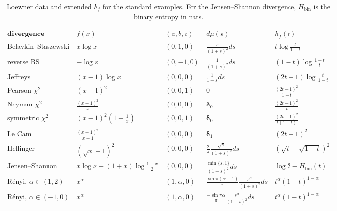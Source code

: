\begin{table}[htbp]
\centering\small
\begin{tabular}{@{}lllll@{}}
\hline
divergence & $f(x)$ & $(a,b,c)$ & $d\mu(s)$ & $h_f(t)$ \\
\hline
Belavkin--Staszewski & $x\log x$ & $(0,1,0)$ & $\frac{s}{(1+s)^2}ds$ & $t\log\frac{t}{1-t}$ \\[2pt]
reverse BS & $-\log x$ & $(0,-1,0)$ & $\frac{1}{(1+s)^2}ds$ & $(1-t)\log\frac{1-t}{t}$ \\[2pt]
Jeffreys & $(x-1)\log x$ & $(0,0,0)$ & $\frac{1}{1+s}ds$ & $(2t-1)\log\frac{t}{1-t}$ \\[2pt]
Pearson $\chi^2$ & $(x-1)^2$ & $(0,0,1)$ & $0$ & $\frac{(2t-1)^2}{1-t}$ \\[2pt]
Neyman $\chi^2$ & $\frac{(x-1)^2}{x}$ & $(0,0,0)$ & $\boldsymbol{\delta}_0$ & $\frac{(2t-1)^2}{t}$ \\[2pt]
symmetric $\chi^2$ & $(x-1)^2(1+\frac1x)$ & $(0,0,1)$ & $\boldsymbol{\delta}_0$ & $\frac{(2t-1)^2}{t(1-t)}$ \\[2pt]
Le Cam & $\frac{(x-1)^2}{x+1}$ & $(0,0,0)$ & $\boldsymbol{\delta}_1$ & $(2t-1)^2$ \\[2pt]
Hellinger & $(\sqrt x-1)^2$ & $(0,0,0)$ & $\frac2\pi\frac{\sqrt s}{(1+s)^2}ds$ & $(\sqrt t-\sqrt{1-t})^2$ \\[2pt]
Jensen--Shannon & $x\log x-(1+x)\log\frac{1+x}{2}$ & $(0,0,0)$ & $\frac{\min\{s,1\}}{(1+s)^2}ds$ & $\log2-H_{\mathrm{bin}}(t)$ \\[2pt]
R\'enyi, $\alpha\in(1,2)$ & $x^\alpha$ & $(1,\alpha,0)$ & $\frac{\sin\pi(\alpha-1)}{\pi}\frac{s^\alpha}{(1+s)^2}ds$ & $t^\alpha(1-t)^{1-\alpha}$ \\[2pt]
R\'enyi, $\alpha\in(-1,0)$ & $x^\alpha$ & $(1,\alpha,0)$ & $\frac{-\sin\pi\alpha}{\pi}\frac{s^\alpha}{(1+s)^2}ds$ & $t^\alpha(1-t)^{1-\alpha}$ \\
\hline
\end{tabular}
\caption{Loewner data and extended $h_f$ for the standard examples. For the Jensen--Shannon divergence, $H_{\mathrm{bin}}$ is the binary entropy in nats.}
\label{cont:tab:loewner}
\end{table}
 
